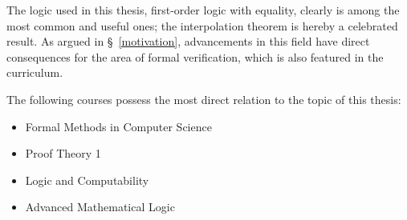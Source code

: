 \documentclass[,%
			paper=a4,%
			DIV11, %
			liststotoc,
			bibtotoc,
			draft=false,%
			numbers=noendperiod
			]{scrartcl}
\begin{document}
The logic used in this thesis, first-order logic with equality, clearly is among the most common and useful ones; the interpolation theorem is hereby a celebrated result.
As argued in \S~\ref{motivation}, advancements in this field have direct consequences for the area of formal verification, which is also featured in the curriculum.

The following courses possess the most direct relation to the topic of this thesis: 
\begin{itemize}
	\item Formal Methods in Computer Science
	\item Proof Theory 1 
	\item Logic and Computability 
	\item Advanced Mathematical Logic 
\end{itemize}


\nocite{*} %


\end{document}
